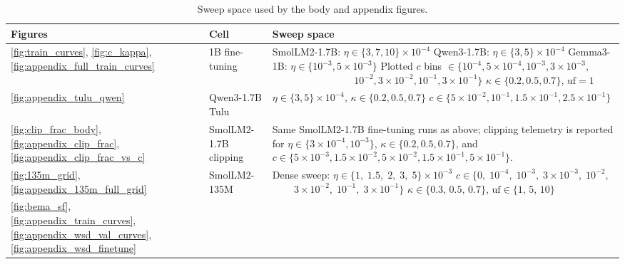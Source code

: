 \begin{table}[h]
\centering
\caption{Sweep space used by the body and appendix figures.}
\footnotesize
\renewcommand{\arraystretch}{1.15}
\setlength{\tabcolsep}{5pt}
\begin{tabular}{@{}l l p{}@{}}
\toprule
\textbf{Figures} & \textbf{Cell} & \textbf{Sweep space} \\
\midrule
\ref{fig:train_curves}, \ref{fig:c_kappa}, \ref{fig:appendix_full_train_curves}
  & 1B fine-tuning
  & SmolLM2-1.7B: $\eta\!\in\!\{3,7,10\}{\times}10^{-4}$\newline
    Qwen3-1.7B: $\eta\!\in\!\{3,5\}{\times}10^{-4}$\newline
    Gemma3-1B: $\eta\!\in\!\{10^{-3},5{\times}10^{-3}\}$\newline
    Plotted $c$ bins $\in\!\{10^{-4},5{\times}10^{-4},10^{-3},3{\times}10^{-3},$\newline
    $\phantom{\text{Plotted }c\text{ bins }\in\!\{}10^{-2},3{\times}10^{-2},10^{-1},3{\times}10^{-1}\}$\newline
    $\kappa\!\in\!\{0.2,0.5,0.7\}$, $\mathrm{uf}{=}1$
  \\
\midrule
\ref{fig:appendix_tulu_qwen}
  & Qwen3-1.7B Tulu
  & $\eta\!\in\!\{3,5\}{\times}10^{-4}$, $\kappa\!\in\!\{0.2,0.5,0.7\}$\newline
    $c\!\in\!\{5{\times}10^{-2},10^{-1},1.5{\times}10^{-1},2.5{\times}10^{-1}\}$
  \\
\midrule
\ref{fig:clip_frac_body}, \ref{fig:appendix_clip_frac}, \ref{fig:appendix_clip_frac_vs_c}
  & SmolLM2-1.7B clipping
  & Same SmolLM2-1.7B fine-tuning runs as above; clipping telemetry is reported for $\eta\!\in\!\{3{\times}10^{-4},10^{-3}\}$, $\kappa\!\in\!\{0.2,0.5,0.7\}$, and $c\!\in\!\{5{\times}10^{-3},1.5{\times}10^{-2},5{\times}10^{-2},1.5{\times}10^{-1},5{\times}10^{-1}\}$.
  \\
\midrule
\ref{fig:135m_grid}, \ref{fig:appendix_135m_full_grid}
  & SmolLM2-135M
  & Dense sweep: $\eta\!\in\!\{1,\;1.5,\;2,\;3,\;5\}{\times}10^{-3}$\newline
    $c\!\in\!\{0,\;10^{-4},\;10^{-3},\;3{\times}10^{-3},\;10^{-2},$\newline
    $\phantom{c\!\in\!\{}3{\times}10^{-2},\;10^{-1},\;3{\times}10^{-1}\}$\newline
    $\kappa\!\in\!\{0.3,\,0.5,\,0.7\}$, $\mathrm{uf}\!\in\!\{1,\,5,\,10\}$
  \\
\midrule
\ref{fig:bema_sf}, \ref{fig:appendix_train_curves}, \ref{fig:appendix_wsd_val_curves}, \ref{fig:appendix_wsd_finetune}

\end{tabular}
\end{table}
